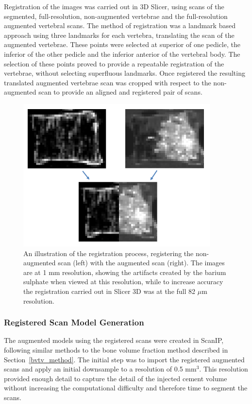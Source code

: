 Registration of the images was carried out in 3D Slicer, using scans of the segmented, full-resolution, non-augmented vertebrae and the full-resolution augmented vertebral scans.
The method of registration was a landmark based approach using three landmarks for each vertebra, translating the scan of the augmented vertebrae.
These points were selected at superior of one pedicle, the inferior of the other pedicle and the inferior anterior of the vertebral body.
The selection of these points proved to provide a repeatable registration of the vertebrae, without selecting superfluous landmarks.
Once registered the resulting translated augmented vertebrae scan was cropped with respect to the non-augmented scan to provide an aligned and registered pair of scans.

\begin{figure}[ht!]
  \centering
  \includegraphics[width=4in]{Chapters/Chapter_HT_images/reg_demo.png}
  \caption{An illustration of the registration process, registering the non-augmented scan (left) with the augmented scan (right). The images are at 1 mm resolution, showing the artifacts created by the barium sulphate when viewed at this resolution, while to increase accuracy the registration carried out in Slicer 3D was at the full 82 $\mu$m resolution.}
  \label{fig:reg_demo}
\end{figure}

\subsubsection{Registered Scan Model Generation}

The augmented models using the registered scans were created in ScanIP, following similar methods to the bone volume fraction method described in Section~\ref{bvtv_method}.
The initial step was to import the registered augmented scans and apply an initial downsample to a resolution of 0.5 mm$^3$.
This resolution provided enough detail to capture the detail of the injected cement volume without increasing the computational difficulty and therefore time to segment the scans.

